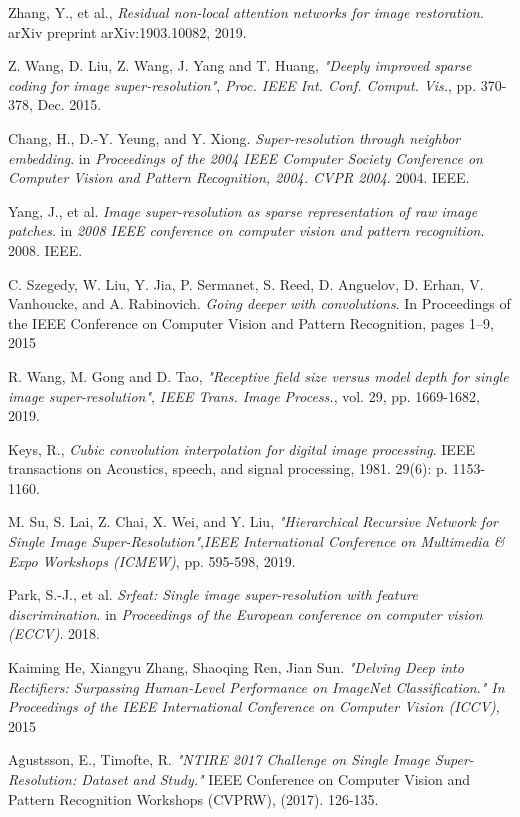 \documentclass{ieeeaccess}
\begin{document}
\begin{thebibliography}{00}
 Zhang, Y., et al., \textit{Residual non-local attention networks for image restoration}. arXiv preprint arXiv:1903.10082, 2019.

 Z. Wang, D. Liu, Z. Wang, J. Yang and T. Huang, \textit{"Deeply improved sparse coding for image super-resolution"}, \textit{Proc. IEEE Int. Conf. Comput. Vis.}, pp. 370-378, Dec. 2015.

 Chang, H., D.-Y. Yeung, and Y. Xiong. \textit{Super-resolution through neighbor embedding}. in \textit{Proceedings of the 2004 IEEE Computer Society Conference on Computer Vision and Pattern Recognition, 2004. CVPR 2004}. 2004. IEEE.

 Yang, J., et al. \textit{Image super-resolution as sparse representation of raw image patches}. in \textit{2008 IEEE conference on computer vision and pattern recognition}. 2008. IEEE.

 C. Szegedy, W. Liu, Y. Jia, P. Sermanet, S. Reed, D. Anguelov, D. Erhan, V. Vanhoucke, and A. Rabinovich. \textit{Going deeper with convolutions}. In Proceedings of the IEEE Conference on Computer Vision and Pattern Recognition, pages 1–9, 2015

 R. Wang, M. Gong and D. Tao, \textit{"Receptive field size versus model depth for single image super-resolution"}, \textit{IEEE Trans. Image Process.}, vol. 29, pp. 1669-1682, 2019.

 Keys, R., \textit{Cubic convolution interpolation for digital image processing}. IEEE transactions on Acoustics, speech, and signal processing, 1981. 29(6): p. 1153-1160.

 M. Su, S. Lai, Z. Chai, X. Wei, and Y. Liu, \textit{"Hierarchical Recursive Network for Single Image Super-Resolution"},\textit{IEEE International Conference on Multimedia \& Expo Workshops (ICMEW)}, pp. 595-598, 2019.

 Park, S.-J., et al. \textit{Srfeat: Single image super-resolution with feature discrimination}. in \textit{Proceedings of the European conference on computer vision (ECCV)}. 2018.

 Kaiming He, Xiangyu Zhang, Shaoqing Ren, Jian Sun. \textit{"Delving Deep into Rectifiers: Surpassing Human-Level Performance on ImageNet Classification}.\textit{" In Proceedings of the IEEE International Conference on Computer Vision (ICCV)}, 2015

 Agustsson, E.,  Timofte, R. \textit{"NTIRE 2017 Challenge on Single Image Super-Resolution: Dataset and Study."} IEEE Conference on Computer Vision and Pattern Recognition Workshops (CVPRW), (2017). 126-135.


\end{thebibliography}
\end{document}
